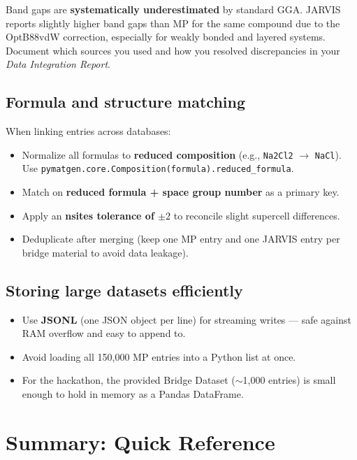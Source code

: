 \documentclass[11pt,a4paper]{article}
\begin{document}
Band gaps are \textbf{systematically underestimated} by standard GGA.
JARVIS reports slightly higher band gaps than MP for the same compound due to the
OptB88vdW correction, especially for weakly bonded and layered systems.
Document which sources you used and how you resolved discrepancies in your
\textit{Data Integration Report}.

\subsection{Formula and structure matching}
When linking entries across databases:
\begin{itemize}
  \item Normalize all formulas to \textbf{reduced composition}
        (e.g., \texttt{Na2Cl2} $\to$ \texttt{NaCl}).
        Use \texttt{pymatgen.core.Composition(formula).reduced\_formula}.
  \item Match on \textbf{reduced formula + space group number} as a primary key.
  \item Apply an \textbf{nsites tolerance of $\pm2$} to reconcile slight
        supercell differences.
  \item Deduplicate after merging (keep one MP entry and one JARVIS entry per
        bridge material to avoid data leakage).
\end{itemize}

\subsection{Storing large datasets efficiently}
\begin{itemize}
  \item Use \textbf{JSONL} (one JSON object per line) for streaming writes ---
        safe against RAM overflow and easy to append to.
  \item Avoid loading all 150,000 MP entries into a Python list at once.
  \item For the hackathon, the provided Bridge Dataset ($\sim$1,000 entries) is
        small enough to hold in memory as a Pandas DataFrame.
\end{itemize}

\section*{Summary: Quick Reference}
\end{document}
